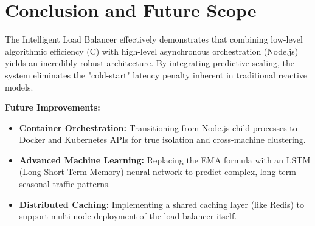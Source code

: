 \documentclass[12pt]{article}
\begin{document}
\section{Conclusion and Future Scope}
The Intelligent Load Balancer effectively demonstrates that combining low-level algorithmic efficiency (C) with high-level asynchronous orchestration (Node.js) yields an incredibly robust architecture. By integrating predictive scaling, the system eliminates the "cold-start" latency penalty inherent in traditional reactive models.

\textbf{Future Improvements:}
\begin{itemize}
    \item \textbf{Container Orchestration:} Transitioning from Node.js child processes to Docker and Kubernetes APIs for true isolation and cross-machine clustering.
    \item \textbf{Advanced Machine Learning:} Replacing the EMA formula with an LSTM (Long Short-Term Memory) neural network to predict complex, long-term seasonal traffic patterns.
    \item \textbf{Distributed Caching:} Implementing a shared caching layer (like Redis) to support multi-node deployment of the load balancer itself.
\end{itemize}
\end{document}
